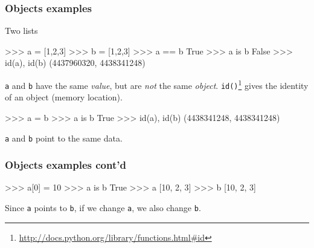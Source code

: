 \documentclass[xetex,10pt]{beamer}
\def\pythoni{\lstinline[language=pythontim]}
\begin{document}
%
%
%
%
%
%
%

\begin{frame}[fragile]
	\frametitle{Objects examples}

Two lists
\begin{python}
>>> a = [1,2,3]
>>> b = [1,2,3]
>>> a == b
True
>>> a is b
False
>>> id(a), id(b)
(4437960320, 4438341248)
\end{python}

\pythoni{a} and \pythoni{b} have the same \emph{value}, but are \emph{not} the same \emph{object}.	\pythoni{id()}\footnote[frame]{\url{http://docs.python.org/library/functions.html\#id}} gives the identity of an object (memory location).
\pause

\begin{python}
>>> a = b
>>> a is b
True
>>> id(a), id(b)
(4438341248, 4438341248)
\end{python}

\pythoni{a} and \pythoni{b} point to the same data.

\end{frame}


\begin{frame}[fragile]
	\frametitle{Objects examples cont'd}

\begin{python}
>>> a[0] = 10
>>> a is b
True
>>> a
[10, 2, 3]
>>> b
[10, 2, 3]
\end{python}

Since \pythoni{a} points to \pythoni{b}, if we change \pythoni{a}, we also change \pythoni{b}.

\end{frame}
\end{document}
